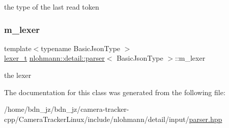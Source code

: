 the type of the last read token 

\mbox{\label{classnlohmann_1_1detail_1_1parser_a22dcc815551a4052b87797b34171b352}} 
\subsubsection{\texorpdfstring{m\+\_\+lexer}{m\_lexer}}
{\footnotesize\ttfamily template$<$typename Basic\+Json\+Type $>$ \\
\hyperlink{classnlohmann_1_1detail_1_1parser_a16030c5af158a94d1c799f82ff3a0147}{lexer\+\_\+t} \hyperlink{classnlohmann_1_1detail_1_1parser}{nlohmann\+::detail\+::parser}$<$ Basic\+Json\+Type $>$\+::m\+\_\+lexer\hspace{0.3cm}{\ttfamily [private]}}



the lexer 



The documentation for this class was generated from the following file\+:\begin{DoxyCompactItemize}
\item 
/home/bdn\+\_\+jz/bdn\+\_\+jz/camera-\/tracker-\/cpp/\+Camera\+Tracker\+Linux/include/nlohmann/detail/input/\hyperlink{parser_8hpp}{parser.\+hpp}\end{DoxyCompactItemize}
